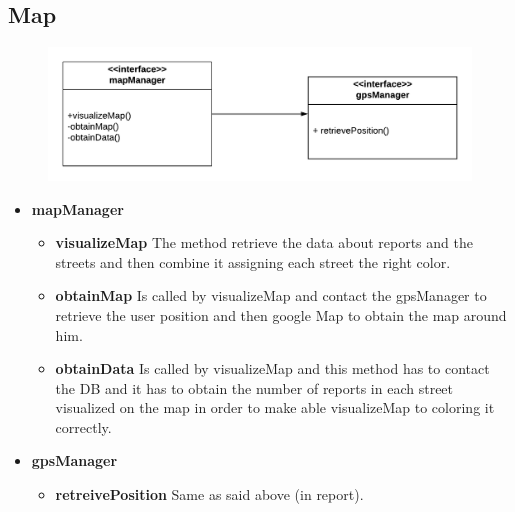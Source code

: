 \documentclass[12pt,a4paper]{report}
\begin{document}
			\subsection{Map}
				\begin{figure}[H]
						\includegraphics[width = \textwidth, center]{mapInterface}
						\label{fig: interfaces}
				\end{figure}
				\begin{itemize}
						\item \textbf{mapManager}
						\begin{itemize}
							\item \textbf{visualizeMap} The method retrieve the data about reports and the streets
								and then combine it assigning each street the right color. 
							\item \textbf{obtainMap} Is called by visualizeMap and contact the gpsManager to
								retrieve the user position and then google Map to obtain the map around him.
							\item \textbf{obtainData} Is called by visualizeMap and this method has to contact the DB
								and it has to obtain the number of reports in each street visualized on the map in
								order to make able visualizeMap to coloring it correctly.
						\end{itemize}
						\item \textbf{gpsManager}
						\begin{itemize}
							\item \textbf{retreivePosition} Same as said above (in report).
						\end{itemize}
				\end{itemize}
\end{document}

